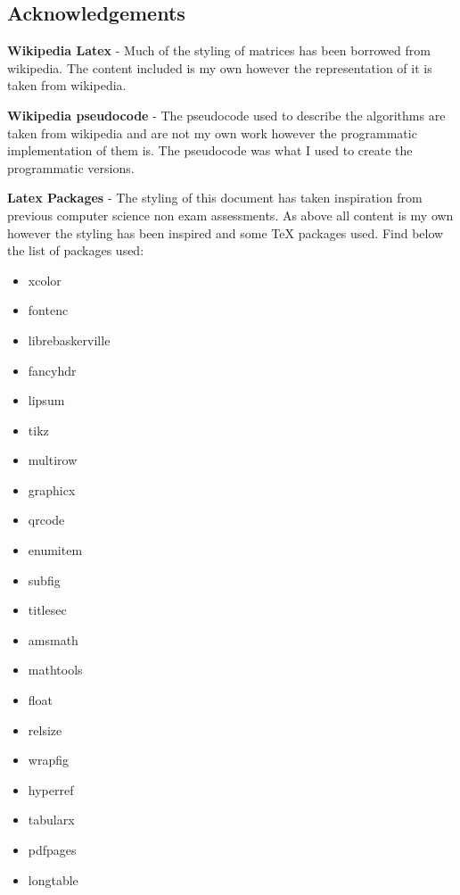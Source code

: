 \begin{flushleft}
    \section{Acknowledgements}
    
    \textbf{Wikipedia Latex} - Much of the styling of matrices has been borrowed from wikipedia. The content included is my own however the representation of it is taken from wikipedia.\\ \BK

    \textbf{Wikipedia pseudocode} - The pseudocode used to describe the algorithms are taken from wikipedia and are not my own work however the programmatic implementation of them is. The pseudocode was what I used to create the programmatic versions.\\ \BK

    \textbf{Latex Packages} - The styling of this document has taken inspiration from previous computer science non exam assessments. As above all content is my own however the styling has been inspired and some TeX packages used. Find below the list of packages used:
    \begin{itemize}
        \item xcolor
        \item fontenc
        \item librebaskerville
        \item fancyhdr
        \item lipsum
        \item tikz
        \item multirow
        \item graphicx
        \item qrcode
        \item enumitem
        \item subfig
        \item titlesec
        \item amsmath
        \item mathtools
        \item float
        \item relsize
        \item wrapfig
        \item hyperref
        \item tabularx
        \item pdfpages
        \item longtable
    \end{itemize}

\end{flushleft}